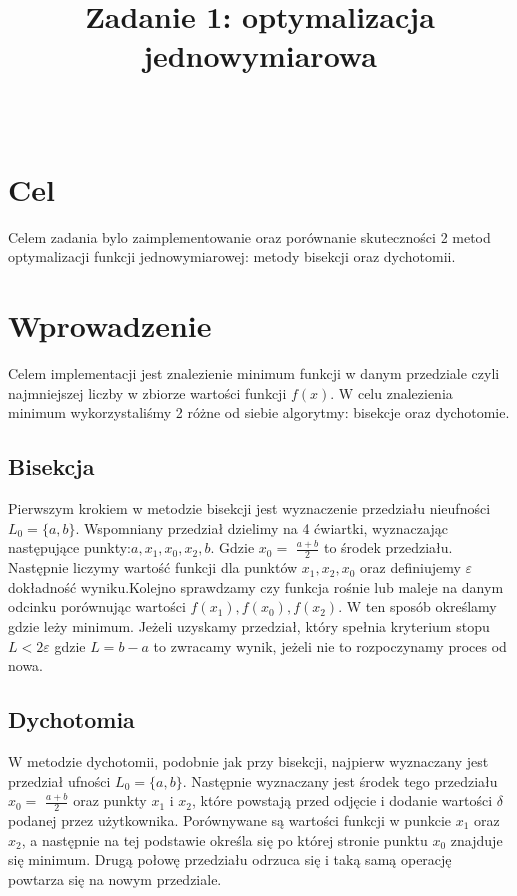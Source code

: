 \documentclass{classrep}
\author{%
  \studentinfo[239703@edu.p.lodz.pl]{Szymon Ruciński}{239703}\\
  \studentinfo[239690@edu.p.lodz.pl]{Krzysztof Moszczyński}{239690}%
}
\title{Zadanie 1: optymalizacja jednowymiarowa}
\begin{document}
\maketitle
\thispagestyle{fancyplain}

\section{Cel}
{Celem zadania bylo zaimplementowanie oraz porównanie skuteczności 2 metod optymalizacji funkcji jednowymiarowej: metody bisekcji oraz dychotomii.}

\section{Wprowadzenie}
{Celem implementacji jest znalezienie minimum funkcji w danym przedziale czyli najmniejszej liczby w zbiorze wartości funkcji $f(x)$. W celu znalezienia minimum wykorzystaliśmy 2 różne od siebie algorytmy: bisekcje oraz dychotomie.}
\subsection{Bisekcja}
{Pierwszym krokiem w metodzie bisekcji jest wyznaczenie przedziału nieufności ${L_0= \{a,b}\}$. Wspomniany przedział dzielimy na 4 ćwiartki, wyznaczając następujące punkty:$a,x_1,x_0,x_2,b$. Gdzie  ${x_0 =}$ \( \frac{a+b}{2} \)} to środek przedziału.
Następnie liczymy wartość funkcji dla punktów $x_1, x_2, x_0$ oraz definiujemy \(\varepsilon\) dokładność wyniku.Kolejno sprawdzamy czy funkcja rośnie lub maleje na danym odcinku porównując wartości $f(x_1),f(x_0), f(x_2)$. W ten sposób określamy gdzie leży minimum. Jeżeli uzyskamy przedział, który spełnia kryterium stopu $L < 2$\(\varepsilon\) gdzie $L=b-a$ to zwracamy wynik, jeżeli nie to rozpoczynamy proces od nowa.

\subsection{Dychotomia}
{W metodzie dychotomii, podobnie jak przy bisekcji, najpierw wyznaczany jest przedział ufności ${L_0= \{a,b\}}$. Następnie wyznaczany jest środek tego przedziału ${x_0 =}$ \( \frac{a+b}{2} \) oraz punkty $x_1$ i $x_2$, które powstają przed odjęcie i dodanie wartości \( \delta \) podanej przez użytkownika. Porównywane są wartości funkcji w punkcie $x_1$ oraz $x_2$, a następnie na tej podstawie określa się po której stronie punktu $x_0$ znajduje się minimum. Drugą połowę przedziału odrzuca się i taką samą operację powtarza się na nowym przedziale.}
\end{document}
